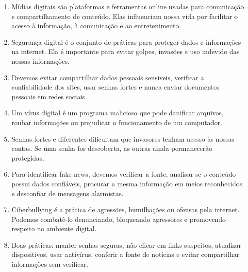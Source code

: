 \documentclass[11pt]{article}
\begin{document}
\begin{enumerate}

\item Mídias digitais são plataformas e ferramentas online usadas para comunicação e compartilhamento de conteúdo. Elas influenciam nossa vida por facilitar o acesso à informação, à comunicação e ao entretenimento.

\item Segurança digital é o conjunto de práticas para proteger dados e informações na internet. Ela é importante para evitar golpes, invasões e uso indevido das nossas informações.

\item Devemos evitar compartilhar dados pessoais sensíveis, verificar a confiabilidade dos sites, usar senhas fortes e nunca enviar documentos pessoais em redes sociais.

\item Um vírus digital é um programa malicioso que pode danificar arquivos, roubar informações ou prejudicar o funcionamento de um computador.

\item Senhas fortes e diferentes dificultam que invasores tenham acesso às nossas contas. Se uma senha for descoberta, as outras ainda permanecerão protegidas.

\item Para identificar fake news, devemos verificar a fonte, analisar se o conteúdo possui dados confiáveis, procurar a mesma informação em meios reconhecidos e desconfiar de mensagens alarmistas.

\item Ciberbullying é a prática de agressões, humilhações ou ofensas pela internet. Podemos combatê-lo denunciando, bloqueando agressores e promovendo respeito no ambiente digital.

\item Boas práticas: manter senhas seguras, não clicar em links suspeitos, atualizar dispositivos, usar antivírus, conferir a fonte de notícias e evitar compartilhar informações sem verificar.

\end{enumerate}
\end{document}
